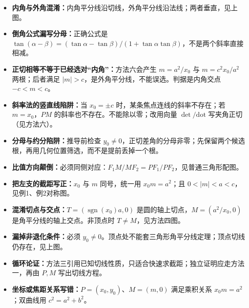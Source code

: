 \clearpage
\begin{trapbox}

\begin{itemize}
\item \textbf{内角与外角混淆：}内角平分线沿切线，外角平分线沿法线；两者垂直，见上图。
\item \textbf{倒角公式漏写分母：}正确公式是 $\tan(\alpha-\beta)=(\tan\alpha-\tan\beta)/(1+\tan\alpha\tan\beta)$，不是两个斜率直接相减。
\item \textbf{正切相等不等于已经选对“内角”：}方法六会产生 $m=a^2/x_0$ 与 $m=c^2x_0/a^2$ 两根；后者满足 $|m|>c$，是外角平分线，不能误选。判据是内角交点 $-c<m<c$。
\item \textbf{斜率法的竖直线陷阱：}当 $x_0=\pm c$ 时，某条焦点连线的斜率不存在；若 $m=x_0$，$PM$ 的斜率也不存在。不能除以零；改用向量 $\det/\mathrm{dot}$ 写夹角正切（见方法六）。
\item \textbf{分母与约分陷阱：}推导前检查 $y_0\ne0$，正切差角的分母非零；先保留两个候选根，再用几何位置筛选，而不是提前丢掉一个根。
\item \textbf{比值方向颠倒：}必须同侧对应：$F_1M/MF_2=PF_1/PF_2$，见普通三角形配图。
\item \textbf{把左支的截距写正：}$x_0$ 与 $m$ 同号，统一用 $x_0m=a^2$；且 $0<|m|<a<c$，见例1、例2对称图。
\item \textbf{混淆切点与交点：}$T=(\operatorname{sgn}(x_0)a,0)$ 是圆的轴上切点，$M=(a^2/x_0,0)$ 是角平分线的轴上交点。非顶点时 $T\ne M$，见方法四图。
\item \textbf{漏掉非退化条件：}必须 $y_0\ne0$。顶点处不能套三角形角平分线定理；顶点切线仍存在，见上图。
\item \textbf{循环论证：}方法三引用已知切线性质，只适合快速求截距；独立证明应走方法一，再由 $P,M$ 写出切线方程。
\item \textbf{坐标或焦距关系写错：}$P=(x_0,y_0)$、$M=(m,0)$ 满足乘积关系 $x_0m=a^2$；双曲线用 $c^2=a^2+b^2$。
\end{itemize}
\end{trapbox}

